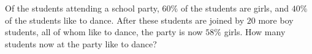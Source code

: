 Of the students attending a school party, $ 60\%$ of the students are girls, and $ 40\%$ of the students like to dance.  After these students are joined by $ 20$ more boy students, all of whom like to dance, the party is now $ 58\%$ girls.  How many students now at the party like to dance?